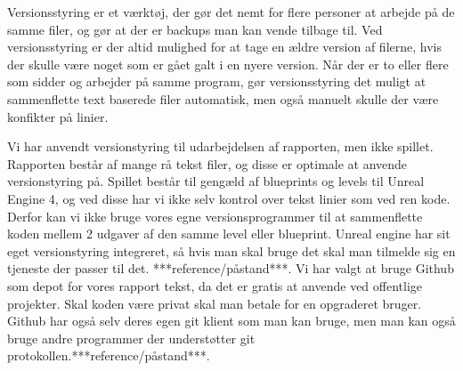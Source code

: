 





Versionsstyring er et værktøj, der gør det nemt for flere personer at arbejde på de samme filer, og gør at der er backups man kan vende tilbage til. Ved versionsstyring er der altid mulighed for at tage en ældre version af filerne, hvis der skulle være
noget som er gået galt i en nyere version. Når der er to eller flere som sidder og arbejder på samme program, gør versionsstyring det muligt at sammenflette text baserede filer automatisk, men også manuelt skulle der være konfikter på linier.

Vi har anvendt versionstyring til udarbejdelsen af rapporten, men ikke spillet. Rapporten består af mange rå tekst filer, og disse er optimale at anvende versionstyring på. Spillet består til gengæld af blueprints og levels til Unreal Engine 4, og ved disse har vi ikke selv kontrol over tekst linier som ved ren kode. Derfor kan vi ikke bruge vores egne versionsprogrammer til at sammenflette koden mellem 2 udgaver af den samme level eller blueprint. Unreal engine har sit eget versionstyring integreret, så hvis man skal bruge det skal man tilmelde sig en tjeneste der passer til det. ***reference/påstand***.
Vi har valgt at bruge Github som depot for vores rapport tekst, da det er gratis at anvende ved offentlige projekter. Skal koden være privat skal man betale for en opgraderet bruger. Github har også selv deres egen git klient som man kan bruge, men man kan også bruge andre programmer der understøtter git protokollen.***reference/påstand***.


